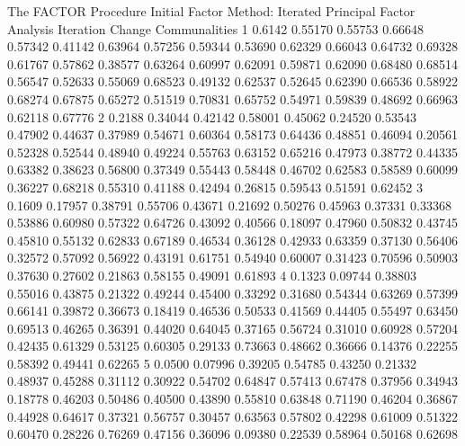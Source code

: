 \documentclass{article}
\begin{document}
\begin{Woutput}
The FACTOR Procedure
Initial Factor Method: Iterated Principal Factor Analysis
Iteration  Change                                   Communalities
    1      0.6142  0.55170  0.55753  0.66648  0.57342  0.41142  0.63964  0.57256  0.59344  0.53690
                   0.62329  0.66043  0.64732  0.69328  0.61767  0.57862  0.38577  0.63264  0.60997
                   0.62091  0.59871  0.62090  0.68480  0.68514  0.56547  0.52633  0.55069  0.68523
                   0.49132  0.62537  0.52645  0.62390  0.66536  0.58922  0.68274  0.67875  0.65272
                   0.51519  0.70831  0.65752  0.54971  0.59839  0.48692  0.66963  0.62118  0.67776
    2      0.2188  0.34044  0.42142  0.58001  0.45062  0.24520  0.53543  0.47902  0.44637  0.37989
                   0.54671  0.60364  0.58173  0.64436  0.48851  0.46094  0.20561  0.52328  0.52544
                   0.48940  0.49224  0.55763  0.63152  0.65216  0.47973  0.38772  0.44335  0.63382
                   0.38623  0.56800  0.37349  0.55443  0.58448  0.46702  0.62583  0.58589  0.60099
                   0.36227  0.68218  0.55310  0.41188  0.42494  0.26815  0.59543  0.51591  0.62452
    3      0.1609  0.17957  0.38791  0.55706  0.43671  0.21692  0.50276  0.45963  0.37331  0.33368
                   0.53886  0.60980  0.57322  0.64726  0.43092  0.40566  0.18097  0.47960  0.50832
                   0.43745  0.45810  0.55132  0.62833  0.67189  0.46534  0.36128  0.42933  0.63359
                   0.37130  0.56406  0.32572  0.57092  0.56922  0.43191  0.61751  0.54940  0.60007
                   0.31423  0.70596  0.50903  0.37630  0.27602  0.21863  0.58155  0.49091  0.61893
    4      0.1323  0.09744  0.38803  0.55016  0.43875  0.21322  0.49244  0.45400  0.33292  0.31680
                   0.54344  0.63269  0.57399  0.66141  0.39872  0.36673  0.18419  0.46536  0.50533
                   0.41569  0.44405  0.55497  0.63450  0.69513  0.46265  0.36391  0.44020  0.64045
                   0.37165  0.56724  0.31010  0.60928  0.57204  0.42435  0.61329  0.53125  0.60305
                   0.29133  0.73663  0.48662  0.36666  0.14376  0.22255  0.58392  0.49441  0.62265
    5      0.0500  0.07996  0.39205  0.54785  0.43250  0.21332  0.48937  0.45288  0.31112  0.30922
                   0.54702  0.64847  0.57413  0.67478  0.37956  0.34943  0.18778  0.46203  0.50486
                   0.40500  0.43890  0.55810  0.63848  0.71190  0.46204  0.36867  0.44928  0.64617
                   0.37321  0.56757  0.30457  0.63563  0.57802  0.42298  0.61009  0.51322  0.60470
                   0.28226  0.76269  0.47156  0.36096  0.09380  0.22539  0.58964  0.50168  0.62698

\end{Woutput}
\end{document}
